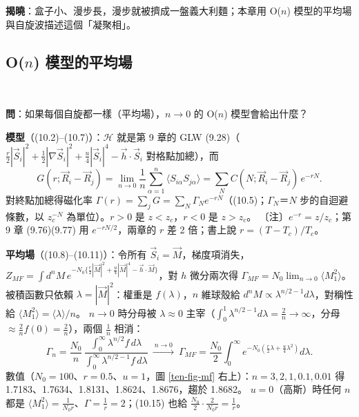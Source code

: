 \textbf{揭曉}：盒子小、漫步長，漫步就被擠成一盤義大利麵；本章用 O($n$) 模型的平均場與自旋波描述這個「凝聚相」。

\subsection{\texorpdfstring{O($n$)}{O(n)} 模型的平均場}
\leavevmode{}\ \par\nopagebreak

\textbf{問}：如果每個自旋都一樣（平均場），$n\to0$ 的 O($n$) 模型會給出什麼？

\textbf{模型}（(10.2)--(10.7)）：$\mathcal H$ 就是第 9 章的 GLW (9.28)（$\frac r2|\vec S_i|^2+\frac12|\nabla\vec S_i|^2+\frac u4|\vec S_i|^4-\vec h\cdot\vec S_i$ 對格點加總），而
\[G(r;\vec R_i-\vec R_j)=\lim_{n\to0}\frac1n\sum_{\alpha=1}^n\langle S_{i\alpha}S_{j\alpha}\rangle=\sum_NC(N;\vec R_i-\vec R_j)\,e^{-rN}.\tag{10.4}\]
對終點加總得磁化率 $\Gamma(r)=\sum_jG=\sum_N\Gamma_Ne^{-rN}$（(10.5)；$\Gamma_N$＝$N$ 步的自迴避條數，以 $z_c^{-N}$ 為單位）。$r>0$ 是 $z<z_c$，$r<0$ 是 $z>z_c$。
〔注〕$e^{-r}=z/z_c$；第 9 章 (9.76)(9.77) 用 $e^{-rN/2}$，兩章的 $r$ 差 2 倍；書上說 $r=(T-T_c)/T_c$。

\textbf{平均場}（(10.8)--(10.11)）：令所有 $\vec S_i=\vec M$，梯度項消失，$Z_{MF}=\int d^nM\,e^{-N_0\{\frac r2|\vec M|^2+\frac u4|\vec M|^4-\vec h\cdot\vec M\}}$，對 $h$ 微分兩次得 $\Gamma_{MF}=N_0\lim_{n\to0}\langle M_1^2\rangle$。
被積函數只依賴 $\lambda=|\vec M|^2$：權重是 $f(\lambda)$，$n$ 維球殼給 $d^nM\propto\lambda^{n/2-1}d\lambda$，對稱性給 $\langle M_1^2\rangle=\langle\lambda\rangle/n$。
$n\to0$ 時分母被 $\lambda\approx0$ 主宰（$\int_0^1\lambda^{n/2-1}d\lambda=\frac2n\to\infty$，分母 $\approx\frac2nf(0)=\frac2n$），兩個 $\frac1n$ 相消：
\[\Gamma_n=\frac{N_0}n\,\frac{\int_0^\infty\lambda^{n/2}f\,d\lambda}{\int_0^\infty\lambda^{n/2-1}f\,d\lambda}\ \xrightarrow{\ n\to0\ }\ \Gamma_{MF}=\frac{N_0}2\int_0^\infty e^{-N_0(\frac r2\lambda+\frac u4\lambda^2)}d\lambda .\tag{10.15}\]
數值（$N_0=100$、$r=0.5$、$u=1$，圖 \ref{ten-fig-mf} 右上）：$n=3,2,1,\allowbreak0.1,0.01$ 得 1.7183、1.7634、1.8131、1.8624、1.8676，趨於 1.8682。
$u=0$（高斯）時任何 $n$ 都是 $\langle M_1^2\rangle=\frac1{N_0r}$、$\Gamma=\frac1r=2$；(10.15) 也給 $\frac{N_0}2\cdot\frac2{N_0r}=\frac1r$。

